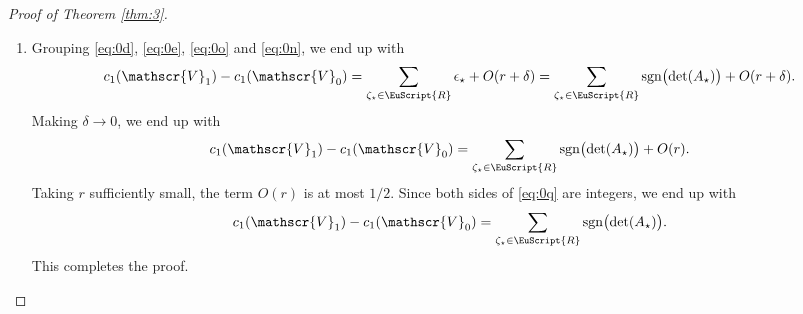 \documentclass[JEP,XML,SOM,Unicode,NoFloatCountersInSection]{cedram}
\let\pazocal\EuScript
\theoremstyle{definition}
\DeclareMathOperator{\sgn}{sgn}
\newcommand{\RRR}{\pazocal{R}}
\newcommand{\VVV}{{\mathscr{V}}}
\newcommand{\R}{\mathbb{R}}
\newcommand{\txi}{{\tilde{\xi}}}
\newcommand{\tb}{{\tilde{b}}}
\newcommand{\matrice}[1]{\arraycolsep3.5pt\begin{bmatrix}#1\end{bmatrix}}
\begin{document}
\begin{proof}[Proof of Theorem \ref{thm:3}]
\begin{enumerate}
We define more appropriate coordinates
\begin{equation}\label{eq:0k}
\txi_1 = \dfrac{t_{12}\delta + t_{22}\xi_1}{t_{11}\delta}, \quad \txi_2 = \dfrac{t_{13}\delta + t_{23}\xi_1 + t_{33}\xi_2}{t_{11}\delta}.
\end{equation}
Using invariance of two-forms under change of coordinates, $b_0(\xi)d\xi = \tb_0(\txi)d\txi$, where $\tb_0(\pm \delta,\txi) d\xi$ is the two-form associated to the negative eigenspace of
\[
\epsilon_\star \delta \cdot t_{11} \bigl( \sigma_1 + \sigma_2 \txi_1 + \sigma_3 \txi_2 \bigr).
\]
This setup allows us to apply \cite[(23)]{FC13}, which gives:
\begin{equation*}
\tb_0(\pm \delta,\txi) = \dfrac{i\epsilon_\star^3 (\pm\delta)^3}{2\delta^3\bigl(\txi^2_1 + \txi_2^2 + 1\bigr)^{3/2}} \matrice{1 \\ \txi_1\\ \txi_2 } \cdot \matrice{0 \\ 1 \\ 0} \wedge \matrice{0 \\ 0 \\ 1} = \dfrac{\pm\epsilon_\star}{2\bigl(\txi^2_1 + \txi_2^2 + 1\bigr)^{3/2}}.
\end{equation*}
Under the change of coordinates \eqref{eq:0k}, the disk $|\xi| \leq r$ gets mapped to an ellipse centered at distance $O(1)$ from the origin, of dimensions $\sim \delta^{-1}$. Thus,
\begin{equation}\label{eq:0n}
\int_{|\xi| \leq r} b_0(\pm\delta,\xi) d\xi = \int_{\R^2} b_0(\pm\delta,\xi) d\xi + O(\delta) = \pm \epsilon_\star \pi + O(\delta).
\end{equation}
We refer to the proof of \cite[Lem.\,2.5]{D19b} for details.

\item
Grouping \eqref{eq:0d}, \eqref{eq:0e}, \eqref{eq:0o} and \eqref{eq:0n}, we end up with
\begin{equation*}
c_1(\VVV_1)-c_1(\VVV_0) = \sum_{\zeta_\star \in \RRR} \epsilon_\star + O(r+\delta) = \sum_{\zeta_\star \in \RRR} \sgn\bigl(\det(A_\star)\bigr) + O(r+\delta).
\end{equation*}
Making $\delta \to 0$, we end up with
\begin{equation}\label{eq:0q}
c_1(\VVV_1)-c_1(\VVV_0) = \sum_{\zeta_\star \in \RRR} \sgn\bigl(\det(A_\star)\bigr) + O(r).
\end{equation}
Taking $r$ sufficiently small, the term $O(r)$ is at most $1/2$. Since both sides of \eqref{eq:0q} are integers, we end up with
\begin{equation*}
c_1(\VVV_1)-c_1(\VVV_0) = \sum_{\zeta_\star \in \RRR} \sgn\bigl(\det(A_\star)\bigr).
\end{equation*}
This completes the proof.\qedhere
\end{enumerate}
\end{proof}
\end{document}

